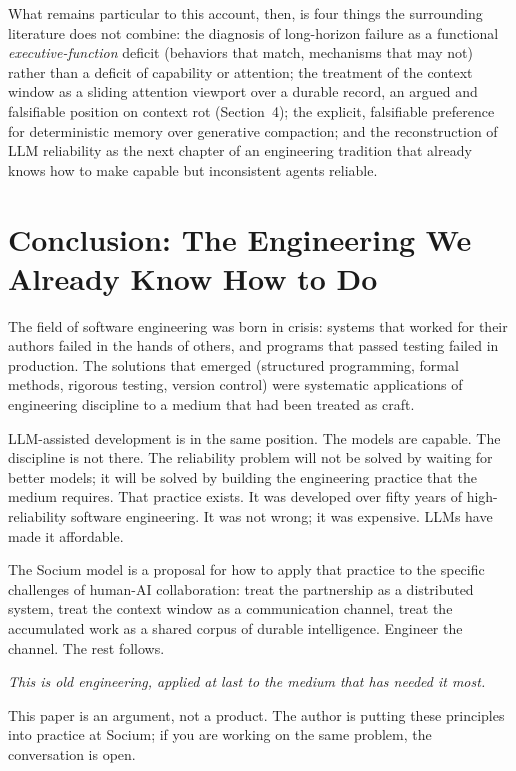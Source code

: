 \documentclass[11pt, a4paper]{article}
\newcommand{\pullquote}[1]{%
  \begin{pullquoteenv}%
    {\setstretch{1.35}\fontsize{11.5}{16}\itshape\color{indigo} #1}%
  \end{pullquoteenv}%
}
\begin{document}
What remains particular to this account, then, is four things
the surrounding literature does not combine: the diagnosis of long-horizon failure as a
functional \emph{executive-function} deficit (behaviors that match, mechanisms that may
not) rather than a deficit of capability or attention; the treatment of the context
window as a sliding attention viewport over a durable record, an argued and falsifiable
position on context rot (Section~4); the explicit, falsifiable
preference for deterministic memory over generative compaction; and the reconstruction of
LLM reliability as the next chapter of an engineering tradition that already knows how
to make capable but inconsistent agents reliable.


\section{Conclusion: The Engineering We Already Know How to Do}

The field of software engineering was born in crisis: systems that worked for their
authors failed in the hands of others, and programs that passed testing failed in
production. The solutions that emerged (structured
programming, formal methods, rigorous testing, version control) were systematic
applications of engineering discipline to a medium that had been treated as craft.

LLM-assisted development is in the same position. The models are capable. The discipline
is not there. The reliability problem will not be solved by waiting for better models; it
will be solved by building the engineering practice that the medium requires. That
practice exists. It was developed over fifty years of high-reliability software
engineering. It was not wrong; it was expensive. LLMs have made it affordable.

The Socium model is a proposal for how to apply that practice to the specific challenges
of human-AI collaboration: treat the partnership as a distributed system, treat the
context window as a communication channel, treat the accumulated work as a shared corpus
of durable intelligence. Engineer the channel. The rest follows.

\pullquote{This is old engineering, applied at last to the medium that has needed it most.}

\bigskip
\noindent This paper is an argument, not a product. The author is putting these principles
into practice at Socium; if you are working on the same problem, the conversation is open.
\end{document}
